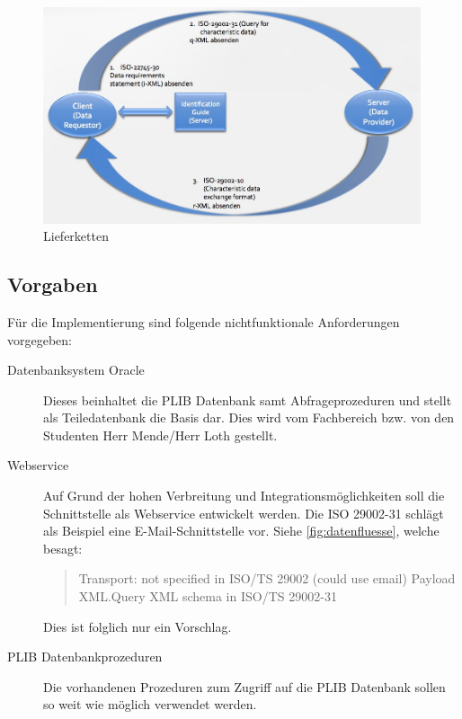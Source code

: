 \begin{figure}[htbp]
	\centering
		\includegraphics[width=0.99\textwidth]{images/lieferketten_plib.jpg}
		\caption[Lieferketten]{Lieferketten\footnotemark}
	\label{fig:lieferketten}
\end{figure}

\subsection{Vorgaben}

Für die Implementierung sind folgende nichtfunktionale Anforderungen vorgegeben:
\begin{description}
\item[Datenbanksystem Oracle] Dieses beinhaltet die PLIB Datenbank samt Abfrageprozeduren und stellt als Teiledatenbank die Basis dar. Dies wird vom Fachbereich bzw. von den Studenten Herr Mende/Herr Loth gestellt.
\item[Webservice] Auf Grund der hohen Verbreitung und Integrationsmöglichkeiten soll die Schnittstelle als \gls{Webservice} entwickelt werden. Die ISO 29002-31 schlägt als Beispiel eine E-Mail-Schnittstelle vor. Siehe \autoref{fig:datenfluesse}, welche besagt:
\begin{quotation}
Transport: not specified in ISO/TS 29002 (could use email) Payload XML.Query XML schema in ISO/TS 29002-31
\end{quotation}
Dies ist folglich nur ein Vorschlag. 
\item[PLIB Datenbankprozeduren] Die vorhandenen Prozeduren zum Zugriff auf die PLIB Datenbank sollen so weit wie möglich verwendet werden. 
\end{description}

